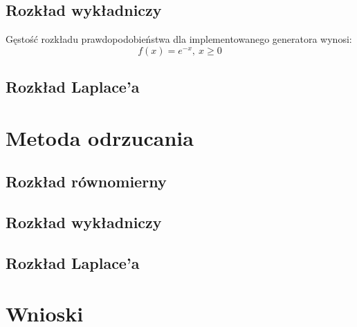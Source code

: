 \documentclass[12pt,a4paper]{article}
\begin{document}
\subsection{Rozkład wykładniczy}
Gęstość rozkładu prawdopodobieństwa dla implementowanego generatora wynosi:
\begin{equation}
f(x) = e^{-x},\ x \geq 0
\end{equation}

\subsection{Rozkład Laplace'a}

\section{Metoda odrzucania}
\subsection{Rozkład równomierny}
\subsection{Rozkład wykładniczy}
\subsection{Rozkład Laplace'a}


\section{Wnioski}

 


\end{document}
